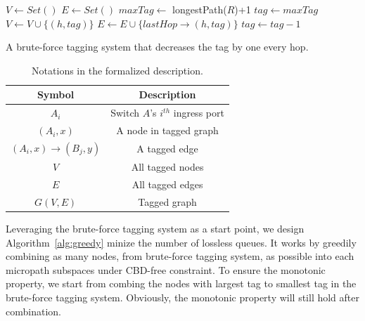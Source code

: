 \begin{algorithm}
	\small
	$V \gets Set()$\;
	$E \gets Set()$\; 
	$maxTag \gets$ longestPath($R$)+1\;
	 {
		$tag \gets maxTag$\;
		 {
			$V \gets V \cup \{(h, tag)\}$\;
			$E \gets E \cup \{lastHop\rightarrow(h, tag)\}$\;
			$tag \gets tag-1$\;
		}
	}
	\;
    \caption{A brute-force tagging system that decreases the tag by one every hop.}
	\label{alg:ttl}
\end{algorithm}


\begin{table}
\small
\centering
\begin{tabular}{|c|c|}
\hline
Symbol & Description \\ \hline
$A_i$ & Switch $A$'s $i^{th}$ ingress port  \\ \hline
$(A_i, x)$ & A node in tagged graph \\ \hline
$(A_i, x)\rightarrow(B_j, y)$ & A tagged edge \\ \hline
$V$ & All tagged nodes  \\ \hline
$E$ & All tagged edges \\ \hline
$G(V, E)$ & Tagged graph \\ \hline
\end{tabular}
\caption{Notations in the formalized description.}
\label{tab:symbols}
\end{table}

 Leveraging the brute-force tagging system as a start
point, we design Algorithm~\ref{alg:greedy} minize the number of lossless
queues. It works by greedily combining as many nodes, from brute-force tagging
system, as possible into each micropath subspaces under CBD-free constraint. To
ensure the monotonic property, we start from combing the nodes with largest tag
to smallest tag in the brute-force tagging system.  Obviously, the monotonic
property will still hold after combination. 

